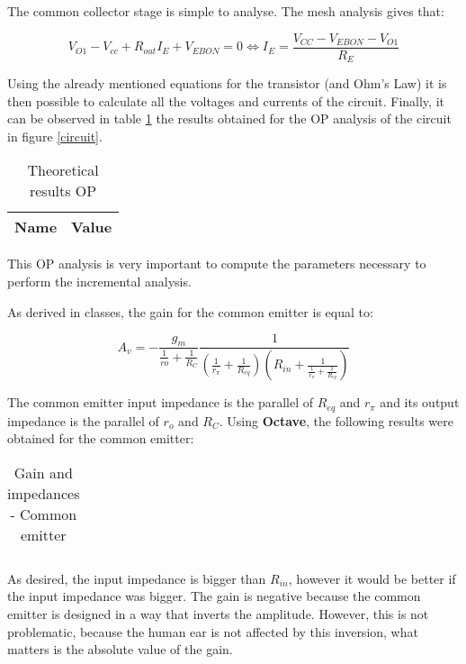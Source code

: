 The common collector stage is simple to analyse. The mesh analysis gives that:

\begin{equation}
        V_{O1}-V_{cc}+R_{out}I_E+V_{EBON} = 0 \iff I_E = \frac{V_{CC}-V_{EBON}-V_{O1}}{R_E}
\end{equation}

Using the already mentioned equations for the transistor (and Ohm's Law) it is then possible to calculate all the voltages and currents of the circuit. Finally, it can be observed in table \ref{opteorico} the results obtained for the OP analysis of the circuit in figure \ref{circuit}.

\begin{table}[H]
  \centering
  \begin{tabular}{|c|c|}
    \hline
        {\bf Name} & {\bf Value} \\
        \hline
        \hline
        
        \hline
  \end{tabular}
  \caption{Theoretical results OP}
  \label{opteorico}
\end{table}

This OP analysis is very important to compute the parameters necessary to perform the incremental analysis.

As derived in classes, the gain for the common emitter is equal to:

\begin{equation}
        A_v = -\frac{g_m}{\frac{1}{ro}+\frac{1}{R_C}}\frac{1}{(\frac{1}{r_{\pi}}+\frac{1}{R_{eq}})(R_{in}+\frac{1}{\frac{1}{r_{\pi}}+\frac{1}{R_{eq}}})}
\end{equation}

The common emitter input impedance is the parallel of $R_{eq}$ and $r_{\pi}$ and its output impedance is the parallel of $r_o$ and $R_C$. Using {\bf Octave}, the following results were obtained for the common emitter:

\begin{table}[H]
  \centering
  \begin{tabular}{|c|c|}
    \hline
        
        \hline
  \end{tabular}
  \caption{Gain and impedances - Common emitter}
  \label{gainemitter}
\end{table}

As desired, the input impedance is bigger than $R_{in}$, however it would be better if the input impedance was bigger. The gain is negative because the common emitter is designed in a way that inverts the amplitude. However, this is not problematic, because the human ear is not affected by this inversion, what matters is the absolute value of the gain.

